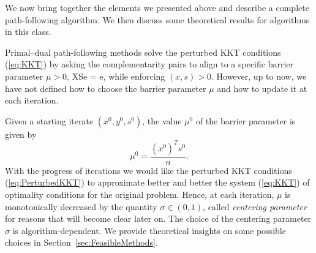We now bring together the elements we presented above and describe
a complete path-following algorithm. We then discuss some
theoretical results for algorithms in this class.

Primal--dual path-following methods solve the perturbed KKT
conditions (\ref{eq:KKT}) by asking the complementarity pairs to align 
to a specific barrier parameter $\mu > 0$,
\be  \label{eq:PerturbedComplementarity}
XSe = \mu e,
\ee
while enforcing $(x,s)>0$.
However, up to now, we have not defined how to choose the
barrier parameter $\mu$ and how to update it at each iteration.

Given a starting iterate $(x^0,y^0,s^0)$, the value $\mu^0$ 
of the barrier parameter is given by
\[
   \mu^0 = \frac{(x^0)^T s^0}{n}.
\]
With the progress of iterations 
we would like the perturbed KKT conditions (\ref{eq:PerturbedKKT}) 
to approximate better and better
the system (\ref{eq:KKT}) of optimality conditions for the original
problem.
Hence, at each iteration, $\mu$ is monotonically decreased by the quantity
$\sigma \in (0,1)$, called {\em centering parameter} for reasons that
will become clear later on.
The choice of the centering parameter $\sigma$ 
is algorithm-dependent. We provide theoretical insights on some
possible choices in Section~\ref{sec:FeasibleMethods}.


